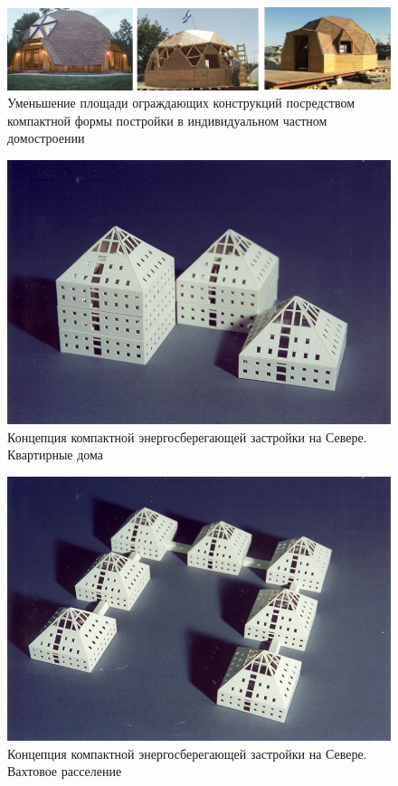 \begin{figure}
    \centering
    \includegraphics[width=\textwidth]{assets/figures/st1ch03_ruexp_003.png}
    \caption{Уменьшение площади ограждающих конструкций посредством компактной формы постройки в индивидуальном частном домостроении}
    \label{fig:st1ch03_ruexp_003}
  \end{figure}

\begin{figure}
    \centering
    \includegraphics[width=\textwidth]{assets/figures/st1ch03_ruexp_004.png}
    \caption{Концепция компактной энергосберегающей застройки на Севере. Квартирные дома}
    \label{fig:st1ch03_ruexp_004}
  \end{figure}


\begin{figure}
    \centering
    \includegraphics[width=\textwidth]{assets/figures/st1ch03_ruexp_005.png}
    \caption{Концепция компактной энергосберегающей застройки на Севере. Вахтовое расселение}
    \label{fig:st1ch03_ruexp_005}
  \end{figure}


